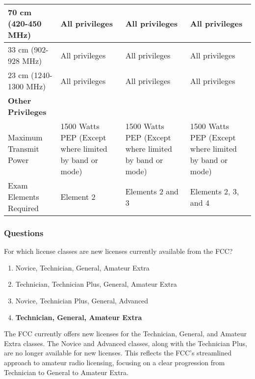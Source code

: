 \begin{table}[h!]
\begin{tabular}{|p{2.5cm}|p{3.5cm}|p{3.5cm}|p{3.5cm}|}
    \hline
    70 cm (420-450 MHz) & All privileges & All privileges & All privileges \\
    \hline
    33 cm (902-928 MHz) & All privileges & All privileges & All privileges \\
    \hline
    23 cm (1240-1300 MHz) & All privileges & All privileges & All privileges \\
    \hline
    \textbf{Other Privileges} &  &  &  \\
    \hline
    Maximum Transmit Power & 1500 Watts PEP (Except where limited by band or mode) & 1500 Watts PEP (Except where limited by band or mode) & 1500 Watts PEP (Except where limited by band or mode)\\
    \hline
    Exam Elements Required & Element 2 & Elements 2 and 3 & Elements 2, 3, and 4 \\
    \hline
    
    \end{tabular}
    \end{table}

\subsubsection{Questions}
\begin{tcolorbox}[colback=gray!10!white,colframe=black!75!black,title={T1C01}]
For which license classes are new licenses currently available from the FCC?
\begin{enumerate}[label=\Alph*),noitemsep]
    \item Novice, Technician, General, Amateur Extra
    \item Technician, Technician Plus, General, Amateur Extra
    \item Novice, Technician Plus, General, Advanced
    \item \textbf{Technician, General, Amateur Extra}
\end{enumerate}
\end{tcolorbox}

 The FCC currently offers new licenses for the Technician, General, and Amateur Extra classes. The Novice and Advanced classes, along with the Technician Plus, are no longer available for new licenses. This reflects the FCC's streamlined approach to amateur radio licensing, focusing on a clear progression from Technician to General to Amateur Extra.

